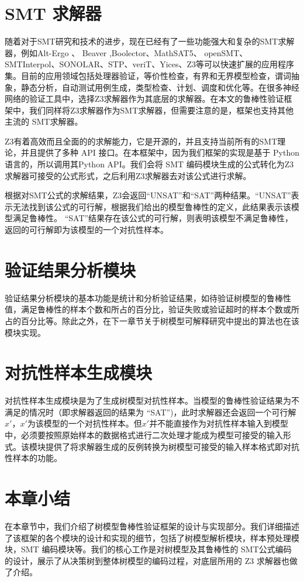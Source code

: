 \section{SMT 求解器}
 随着对于SMT研究和技术的进步，现在已经有了一些功能强大和复杂的SMT求解器，例如Alt-Ergo \cite{bobot2008implementing}、 Beaver \cite{jha2009beaver},Boolector\cite{brummayer2009boolector}、MathSAT5\cite{cimatti2013mathsat5}、 openSMT\cite{bruttomesso2010opensmt}、 SMTInterpol\cite{christ2012smtinterpol}、SONOLAR\cite{peleska2011automated}、STP\cite{ganesh2007decision}、veriT\cite{bouton2009verit}、Yices\cite{dutertre2006yices}、Z3\cite{de2008z3}等可以快速扩展的应用程序集。目前的应用领域包括处理器验证，等价性检查，有界和无界模型检查，谓词抽象，静态分析，自动测试用例生成，类型检查、计划、调度和优化等。在很多神经网络的验证工具\cite{sato2019formal,2017Safety,2019Synthesizing,2017Formal}中，选择Z3求解器作为其底层的求解器。在本文的鲁棒性验证框架中，我们同样将Z3求解器作为SMT求解器，但需要注意的是，框架也支持其他主流的 SMT求解器。

Z3有着高效而且全面的的求解能力，它是开源的，并且支持当前所有的SMT理论，并且提供了多种 API 接口。在本框架中，因为我们框架的实现是基于 Python 语言的，所以调用其Python API。我们会将 SMT 编码模块生成的公式转化为Z3求解器可接受的公式形式，之后利用Z3求解器去对该公式进行求解。

根据对SMT公式的求解结果，Z3会返回“UNSAT”和“SAT”两种结果。“UNSAT”表示无法找到该公式的可行解，根据我们给出的模型鲁棒性的定义，此结果表示该模型满足鲁棒性。 “SAT”结果存在该公式的可行解，则表明该模型不满足鲁棒性，返回的可行解即为该模型的一个对抗性样本。

\section{验证结果分析模块}
 验证结果分析模块的基本功能是统计和分析验证结果，如待验证树模型的鲁棒性值，满足鲁棒性的样本个数和所占的百分比，验证失败或验证超时的样本个数或所占的百分比等。除此之外，在下一章节关于树模型可解释研究中提出的算法也在该模块实现。
\section{对抗性样本生成模块}
对抗性样本生成模块是为了生成树模型对抗性样本。当模型的鲁棒性验证结果为不满足的情况时（即求解器返回的结果为 “SAT”)，此时求解器还会返回一个可行解 $x'$，$x'$为该模型的一个对抗性样本。但$x'$并不能直接作为对抗性样本输入到模型中，必须要按照原始样本的数据格式进行二次处理才能成为模型可接受的输入形式。该模块提供了将求解器生成的反例转换为树模型可接受的输入样本格式即对抗性样本的功能。
\section{本章小结}
在本章节中，我们介绍了树模型鲁棒性验证框架的设计与实现部分。我们详细描述了该框架的各个模块的设计和实现的细节，包括了树模型解析模块，样本预处理模块，SMT 编码模块等。我们的核心工作是对树模型及其鲁棒性的 SMT公式编码的设计，展示了从决策树到整体树模型的编码过程，对底层所用的 Z3 求解器也做了介绍。
